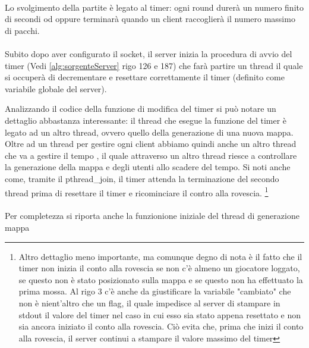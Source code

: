 \documentclass[a4paper]{article}
\begin{document}
\paragraph{}
Lo svolgimento della partite è legato al timer:  ogni round durerà un numero finito di secondi od oppure terminarà
quando un client raccoglierà il numero massimo di pacchi.
\paragraph{}
Subito dopo aver configurato il socket, il server inizia la procedura di avvio del timer (Vedi \autoref{alg:sorgenteServer} rigo 126 e 187) che farà partire un thread il quale si occuperà
di decrementare e resettare correttamente il timer (definito come variabile globale del server).

Analizzando il codice della funzione di modifica del timer si può notare un dettaglio abbastanza interessante: 
il thread che esegue la funzione del timer è legato ad un altro thread, ovvero quello della generazione di una nuova mappa.
Oltre ad un thread per gestire ogni client abbiamo quindi anche un altro thread che va a gestire il tempo ,
il quale attraverso un altro thread riesce a controllare la generazione della mappa e degli utenti allo scadere del tempo.
Si noti anche come, tramite il pthread\_join, il timer attenda la terminazione del secondo thread prima di resettare il timer e ricominciare il contro alla rovescia.
\footnote{Altro dettaglio meno importante, ma comunque degno di nota è il fatto che il timer non inizia il conto alla rovescia
se non c'è almeno un giocatore loggato, se questo non è stato posizionato sulla mappa e se questo non ha effettuato la prima mossa.
Al rigo 3 c'è anche da giustificare la variabile "cambiato" che non è nient'altro che un flag, il quale impedisce al server di stampare in stdout il valore del timer nel caso in cui esso sia stato appena resettato e non sia ancora iniziato il conto alla rovescia. Ciò evita che, prima che inizi il conto alla rovescia, il server continui a stampare il valore massimo del timer }
\paragraph{}
Per completezza si riporta anche la funzionione iniziale del thread di generazione mappa

\end{document}
